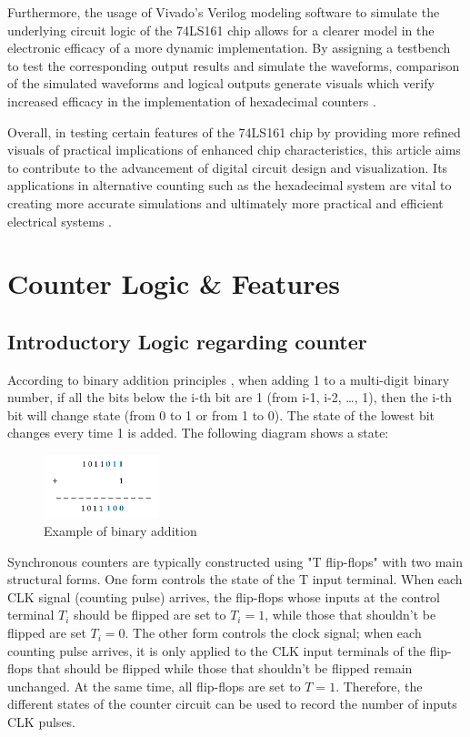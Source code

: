 \documentclass[conference]{IEEEtran}
\begin{document}
Furthermore, the usage of Vivado’s Verilog modeling software to simulate the underlying circuit logic of the 74LS161 chip allows for a clearer model in the electronic efficacy of a more dynamic implementation. By assigning a testbench to test the corresponding output results and simulate the waveforms, comparison of the simulated waveforms and logical outputs generate visuals which verify increased efficacy in the implementation of hexadecimal counters \cite{Yashas2019}.

Overall, in testing certain features of the 74LS161 chip by providing more refined visuals of practical implications of enhanced chip characteristics, this article aims to contribute to the advancement of digital circuit design and visualization. Its applications in alternative counting such as the hexadecimal system are vital to creating more accurate simulations and ultimately more practical and efficient electrical systems \cite{Zhang2016}.

\section{Counter Logic \& Features}

\subsection{Introductory Logic regarding counter}
According to binary addition principles \cite{Reitwiesner1960}, when adding 1 to a multi-digit binary number, if all the bits below the i-th bit are 1 (from i-1, i-2, …, 1), then the i-th bit will change state (from 0 to 1 or from 1 to 0). The state of the lowest bit changes every time 1 is added. The following diagram shows a state:

\begin{figure}[h]
    \centering
    \includegraphics[width=0.3\textwidth]{binary_counter}
    \caption{Example of binary addition}
\end{figure}

Synchronous counters are typically constructed using "T flip-flops" \cite{Irving1976} with two main structural forms. One form controls the state of the T input terminal. When each CLK signal (counting pulse) arrives, the flip-flops whose inputs at the control terminal $T_i$ should be flipped are set to $T_i=1$, while those that shouldn't be flipped are set $T_i=0$. The other form controls the clock signal; when each counting pulse arrives, it is only applied to the CLK input terminals of the flip-flops that should be flipped while those that shouldn't be flipped remain unchanged. At the same time, all flip-flops are set to $T=1$. Therefore, the different states of the counter circuit can be used to record the number of inputs CLK pulses.
\end{document}
